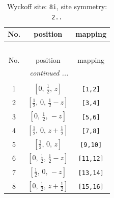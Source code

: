 \documentclass[fleqn,8pt]{jsarticle}
\begin{document}
\renewcommand{\arraystretch}{1.2}
\begin{longtable}{ccc}
\caption{Wyckoff site: {\tt 8i}, site symmetry: {\tt 2..}}
 \\
 \hline \hline
No. & position & mapping \\ \hline \endfirsthead

\multicolumn{2}{l}{\tablename\ \thetable{}} \\
 \hline \hline
No. & position & mapping \\ \hline \endhead

 \hline \hline
\multicolumn{2}{r}{\footnotesize\it continued ...} \\ \endfoot

 \hline \hline
\multicolumn{2}{r}{} \\ \endlastfoot

1 & $\left[ 0,\, \frac{1}{2},\, z \right]$ & {\tt [1,2]} \\ \hline
2 & $\left[ \frac{1}{2},\, 0,\, \frac{1}{2} - z \right]$ & {\tt [3,4]} \\ \hline
3 & $\left[ 0,\, \frac{1}{2},\, - z \right]$ & {\tt [5,6]} \\ \hline
4 & $\left[ \frac{1}{2},\, 0,\, z + \frac{1}{2} \right]$ & {\tt [7,8]} \\ \hline
5 & $\left[ \frac{1}{2},\, 0,\, z \right]$ & {\tt [9,10]} \\ \hline
6 & $\left[ 0,\, \frac{1}{2},\, \frac{1}{2} - z \right]$ & {\tt [11,12]} \\ \hline
7 & $\left[ \frac{1}{2},\, 0,\, - z \right]$ & {\tt [13,14]} \\ \hline
8 & $\left[ 0,\, \frac{1}{2},\, z + \frac{1}{2} \right]$ & {\tt [15,16]} \\
\end{longtable}
\renewcommand{\arraystretch}{1.2}
\end{document}
